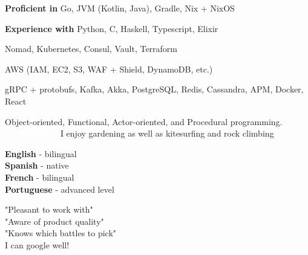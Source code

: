 \documentclass[9pt]{developercv}
\newcommand{\para}{\vspace{0.4em}}
\begin{document}
    \vspace{1em}
    \begin{minipage}[t]{0.62\textwidth}
        \vspace{-\baselineskip} %


        \vspace{-0.5em}
        \textbf{Proficient in} Go, JVM (Kotlin, Java), Gradle, Nix + NixOS

        \para
        \textbf{Experience with}
        Python, C, Haskell, Typescript, Elixir

        \para

        Nomad, Kubernetes, Consul, Vault, Terraform

        \para

        AWS (IAM, EC2, S3, WAF + Shield, DynamoDB, etc.)

        \para

        gRPC + protobufs, Kafka, Akka, PostgreSQL, Redis, Cassandra, APM, Docker, React

        \para

        Object-oriented, Functional, Actor-oriented, and Procedural programming.
        \\

        \colorbox{accent}{\textcolor{white}{\MakeUppercase{\textbf{Hobbies}}}}~~
        I enjoy gardening as well as kitesurfing and rock climbing
    \end{minipage}
    \hfill
    \begin{minipage}[t]{0.35\textwidth}
        \vspace{-\baselineskip} %

        \vspace{-0.5em}
        \textbf{English} - bilingual\\
        \textbf{Spanish} - native\\
        \textbf{French} - bilingual\\
        \textbf{Portuguese} - advanced level\\


        \vspace{-0.5em}
        "Pleasant to work with"\\
        "Aware of product quality"\\
        "Knows which battles to pick"\\
        I can google well!
    \end{minipage}
    \vspace{1.2em}
    \hfill
%

\end{document}
